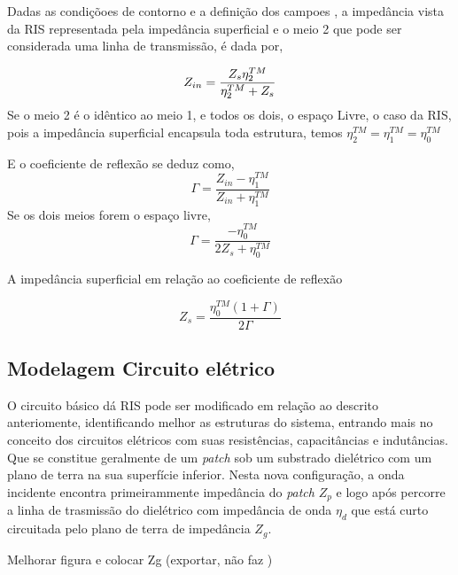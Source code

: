 \documentclass[
	12pt,				%
	openright,			%
	oneside,			%
	a4paper,			%
	english,			%
	brazil				%
	]{abntex2}
\begin{document}
Dadas as condiçõoes de contorno e a definição dos campoes \cite{A}, a impedância vista da RIS representada pela impedância superficial e o meio 2 que pode ser considerada uma linha de transmissão, é dada por,

\begin{equation}{\label{ImpedanciaZinParaleloZsEta2}}
   Z_{in}= \frac{Z_s \eta_2^{TM} }{\eta_2^{TM}+Z_s}
\end{equation}
Se o meio 2 é o idêntico ao meio 1, e todos os dois, o espaço Livre, o caso da RIS, pois a impedância superficial encapsula toda estrutura, temos $\eta^{TM}_{2}=\eta^{TM}_1=\eta^{TM}_0$

E o coeficiente de reflexão se deduz como,
\begin{equation}
   \Gamma= \frac{Z_{in}-\eta_1^{TM}}
    {Z_{in}+\eta_1^{TM}}
\end{equation}
Se os dois meios forem o espaço livre,
\begin{equation}
    \Gamma=\frac{-\eta^{TM}_0}{2Z_s+\eta^{TM}_0}
\end{equation}

A impedância superficial em relação ao coeficiente de reflexão

\begin{equation}
    Z_s=\frac{\eta^{TM}_0(1+\Gamma)}{2\Gamma}
\end{equation}

\subsection{ Modelagem Circuito elétrico\label{FormulaçãoCircuitos}}

O circuito básico dá RIS pode ser modificado em relação ao descrito anteriomente, identificando melhor as estruturas do sistema, entrando mais no conceito dos circuitos elétricos com suas resistências, capacitâncias e indutâncias. Que se constitue geralmente de um \textit{patch} sob um substrado dielétrico com um plano de terra na sua superfície inferior. Nesta nova configuração, a onda incidente encontra primeirammente impedância do \textit{patch}  $Z_p$ e logo após percorre a linha de trasmissão do dielétrico com impedância de onda $\eta_d$ que está curto circuitada pelo plano de terra de impedância $Z_g$.

Melhorar figura e colocar Zg (exportar, não faz )
\end{document}

